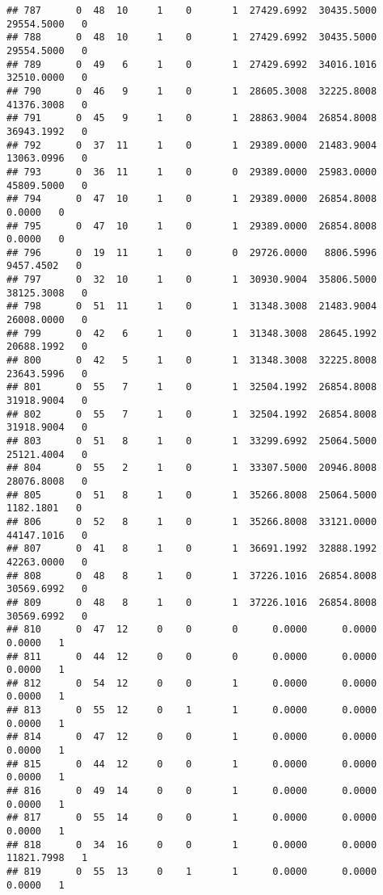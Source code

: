 \documentclass[
]{article}
\begin{document}
\begin{enumerate}
\begin{verbatim}
## 787      0  48  10     1    0       1  27429.6992  30435.5000  29554.5000   0
## 788      0  48  10     1    0       1  27429.6992  30435.5000  29554.5000   0
## 789      0  49   6     1    0       1  27429.6992  34016.1016  32510.0000   0
## 790      0  46   9     1    0       1  28605.3008  32225.8008  41376.3008   0
## 791      0  45   9     1    0       1  28863.9004  26854.8008  36943.1992   0
## 792      0  37  11     1    0       1  29389.0000  21483.9004  13063.0996   0
## 793      0  36  11     1    0       0  29389.0000  25983.0000  45809.5000   0
## 794      0  47  10     1    0       1  29389.0000  26854.8008      0.0000   0
## 795      0  47  10     1    0       1  29389.0000  26854.8008      0.0000   0
## 796      0  19  11     1    0       0  29726.0000   8806.5996   9457.4502   0
## 797      0  32  10     1    0       1  30930.9004  35806.5000  38125.3008   0
## 798      0  51  11     1    0       1  31348.3008  21483.9004  26008.0000   0
## 799      0  42   6     1    0       1  31348.3008  28645.1992  20688.1992   0
## 800      0  42   5     1    0       1  31348.3008  32225.8008  23643.5996   0
## 801      0  55   7     1    0       1  32504.1992  26854.8008  31918.9004   0
## 802      0  55   7     1    0       1  32504.1992  26854.8008  31918.9004   0
## 803      0  51   8     1    0       1  33299.6992  25064.5000  25121.4004   0
## 804      0  55   2     1    0       1  33307.5000  20946.8008  28076.8008   0
## 805      0  51   8     1    0       1  35266.8008  25064.5000   1182.1801   0
## 806      0  52   8     1    0       1  35266.8008  33121.0000  44147.1016   0
## 807      0  41   8     1    0       1  36691.1992  32888.1992  42263.0000   0
## 808      0  48   8     1    0       1  37226.1016  26854.8008  30569.6992   0
## 809      0  48   8     1    0       1  37226.1016  26854.8008  30569.6992   0
## 810      0  47  12     0    0       0      0.0000      0.0000      0.0000   1
## 811      0  44  12     0    0       0      0.0000      0.0000      0.0000   1
## 812      0  54  12     0    0       1      0.0000      0.0000      0.0000   1
## 813      0  55  12     0    1       1      0.0000      0.0000      0.0000   1
## 814      0  47  12     0    0       1      0.0000      0.0000      0.0000   1
## 815      0  44  12     0    0       1      0.0000      0.0000      0.0000   1
## 816      0  49  14     0    0       1      0.0000      0.0000      0.0000   1
## 817      0  55  14     0    0       1      0.0000      0.0000      0.0000   1
## 818      0  34  16     0    0       1      0.0000      0.0000  11821.7998   1
## 819      0  55  13     0    1       1      0.0000      0.0000      0.0000   1

\end{verbatim}
\end{enumerate}
\end{document}
